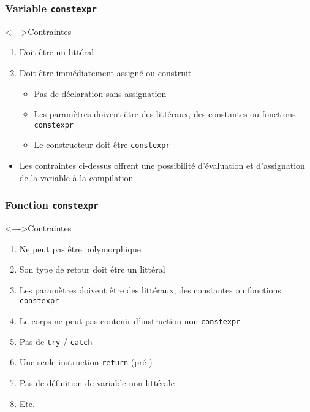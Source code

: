 \begin{frame}
\frametitle{Variable \texttt{constexpr}}
\begin{exampleblock}<+->{Contraintes}
	\begin{enumerate}[<+->]
	\item Doit être un littéral
	\item Doit être immédiatement assigné ou construit
		\begin{itemize}
		\item Pas de déclaration sans assignation
		\item Les paramètres doivent être des littéraux, des constantes ou fonctions \lstinline|constexpr|
		\item Le constructeur doit être \lstinline|constexpr|
		\end{itemize}
	\end{enumerate}
\end{exampleblock}
\begin{itemize}[<+->]
\item Les contraintes ci-dessus offrent une possibilité d'évaluation et d'assignation de la variable à la compilation
\end{itemize}
\end{frame}

\begin{frame}
\frametitle{Fonction \texttt{constexpr}}
\begin{exampleblock}<+->{Contraintes}
	\begin{enumerate}[<+->]
	\item Ne peut pas être polymorphique
	\item Son type de retour doit être un littéral
	\item Les paramètres doivent être des littéraux, des constantes ou fonctions \lstinline|constexpr|
	\item Le corps ne peut pas contenir d'instruction non \lstinline|constexpr|
	\item Pas de \lstinline|try| / \lstinline|catch|
	\item Une seule instruction \lstinline|return| (pré )	
	\item Pas de définition de variable non littérale
	\item Etc.
	\end{enumerate}
\end{exampleblock}
\end{frame}

